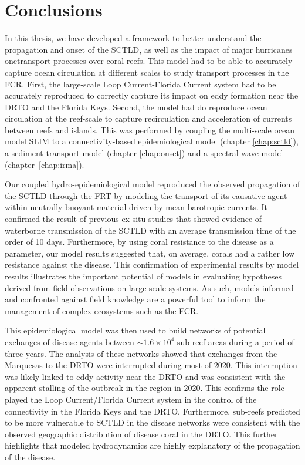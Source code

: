 \section{Conclusions}
In this thesis, we have developed a framework to better understand the propagation and onset of the SCTLD, as well as the impact of major hurricanes onctransport processes over coral reefs. This model had to be able to accurately capture ocean circulation at different scales to study transport processes in the FCR. First, the large-scale Loop Current-Florida Current system had to be accurately reproduced to correctly capture its impact on eddy formation near the DRTO and the Florida Keys. Second, the model had do reproduce ocean circulation at the reef-scale to capture recirculation and acceleration of currents between reefs and islands. This was performed by coupling the multi-scale ocean model SLIM to a connectivity-based epidemiological model (chapter \ref{chap:sctld}), a sediment transport model (chapter \ref{chap:onset}) and a spectral wave model (chapter~\ref{chap:irma}).

Our coupled hydro-epidemiological model reproduced the observed propagation of the SCTLD through the FRT by modeling the transport of its causative agent within neutrally buoyant material driven by mean barotropic currents. It confirmed the result of previous ex-situ studies that showed evidence of waterborne transmission of the SCTLD with an average transmission time of the order of 10 days. Furthermore, by using coral resistance to the disease as a parameter, our model results suggested that, on average, corals had a rather low resistance against the disease. This confirmation of experimental results by model results illustrates the important potential of models in evaluating hypotheses derived from field observations on large scale systems. As such, models informed and confronted against field knowledge are a powerful tool to inform the management of complex ecosystems such as the FCR.

This epidemiological model was then used to build networks of potential exchanges of disease agents between $\sim 1.6\times10^4$ sub-reef areas during a period of three years. The analysis of these networks showed that exchanges from the Marquesas to the DRTO were interrupted during most of 2020. This interruption was likely linked to eddy activity near the DRTO and was consistent with the apparent stalling of the outbreak in the region in 2020. This confirms the role played the Loop Current/Florida Current system in the control of the connectivity in the Florida Keys and the DRTO. Furthermore, sub-reefs predicted to be more vulnerable to SCTLD in the disease networks were consistent with the observed geographic distribution of disease coral in the DRTO. This further highlights that modeled hydrodynamics are highly explanatory of the propagation of the disease.

